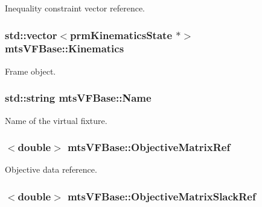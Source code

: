 Inequality constraint vector reference. 

\hypertarget{classmts_v_f_base_ad68e05d7529b31405ab7efc74a2dbeaa}{
\subsubsection[{Kinematics}]{\setlength{\rightskip}{0pt plus 5cm}std\-::vector$<$prm\-Kinematics\-State $\ast$$>$ mts\-V\-F\-Base\-::\-Kinematics}}\label{classmts_v_f_base_ad68e05d7529b31405ab7efc74a2dbeaa}


Frame object. 

\hypertarget{classmts_v_f_base_ab8c00c15a86f7df135f985e10983065e}{
\subsubsection[{Name}]{\setlength{\rightskip}{0pt plus 5cm}std\-::string mts\-V\-F\-Base\-::\-Name}}\label{classmts_v_f_base_ab8c00c15a86f7df135f985e10983065e}


Name of the virtual fixture. 

\hypertarget{classmts_v_f_base_ac4da2ed51e5b51a104ad0949457aaadb}{
\subsubsection[{Objective\-Matrix\-Ref}]{$<$double$>$ mts\-V\-F\-Base\-::\-Objective\-Matrix\-Ref}}\label{classmts_v_f_base_ac4da2ed51e5b51a104ad0949457aaadb}


Objective data reference. 

\hypertarget{classmts_v_f_base_a97679c797cd0099833eab17d255be220}{
\subsubsection[{Objective\-Matrix\-Slack\-Ref}]{$<$double$>$ mts\-V\-F\-Base\-::\-Objective\-Matrix\-Slack\-Ref}}\label{classmts_v_f_base_a97679c797cd0099833eab17d255be220}


